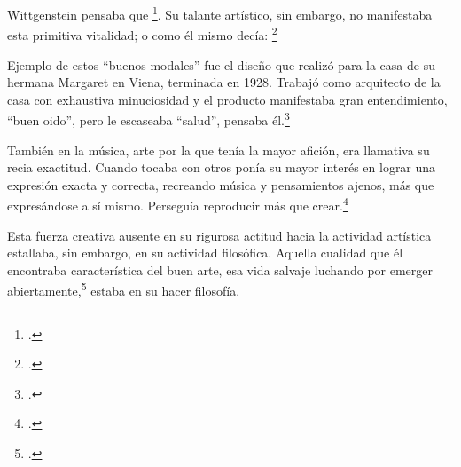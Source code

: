 
Wittgenstein pensaba que
\footcite[p.~43e]{cnv}. 
Su talante artístico, sin embargo, no manifestaba esta primitiva vitalidad; o
como él mismo decía:
\footcite[p.~29e]{cnv}

Ejemplo de estos ``buenos modales'' fue el diseño que realizó para la casa
de su hermana Margaret en Viena, terminada en 1928.
Trabajó como arquitecto de la casa con exhaustiva minuciosidad y el producto
manifestaba gran entendimiento, ``buen oido'', pero le escaseaba ``salud'',
pensaba él.\footcite[p.~43e]{cnv}

También en la música, arte por la que tenía la mayor afición, era llamativa su
recia exactitud. Cuando tocaba con otros ponía su mayor interés en lograr una
expresión exacta y correcta, recreando música y pensamientos ajenos, más que
expresándose a sí mismo. Perseguía reproducir más que
crear.\footcite[loc.˜]{monk}

Esta fuerza creativa ausente en su rigurosa actitud hacia la actividad artística
estallaba, sin embargo, en su actividad filosófica. Aquella cualidad que él
encontraba característica del buen arte, esa vida salvaje luchando por emerger
abiertamente,\footcite[cf.˜][loc.˜]{monk} estaba en su hacer filosofía.

